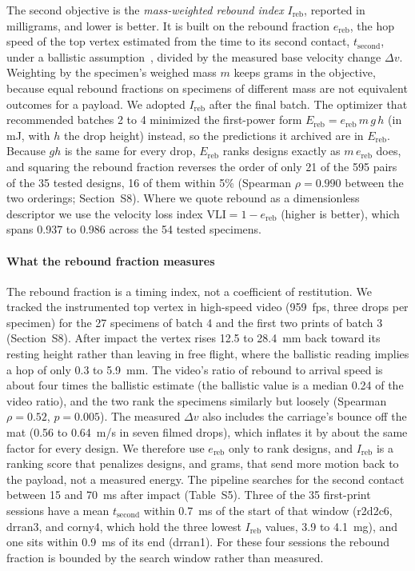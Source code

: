 \documentclass[11pt]{article}
\begin{document}
The second objective is the \emph{mass-weighted rebound index}
$I_{\mathrm{reb}}$, reported in milligrams, and lower is better. It is
built on the rebound fraction $e_{\mathrm{reb}}$, the hop speed of the
top vertex estimated from the time to its second contact,
$t_{\mathrm{second}}$, under a ballistic
assumption~\citep{bernstein1977listening}, divided by the measured base
velocity change $\Delta v$. Weighting by the specimen's weighed mass $m$
keeps grams in the objective, because equal rebound fractions on
specimens of different mass are not equivalent outcomes for a payload.
We adopted $I_{\mathrm{reb}}$ after the final batch. The optimizer that
recommended batches 2 to 4 minimized the first-power form
$E_{\mathrm{reb}} = e_{\mathrm{reb}}\, m\, g\, h$ (in mJ, with $h$ the
drop height) instead, so the predictions it archived are in
$E_{\mathrm{reb}}$. Because $g h$ is the same for every drop,
$E_{\mathrm{reb}}$ ranks designs exactly as $m\,e_{\mathrm{reb}}$ does,
and squaring the rebound fraction reverses the order of only 21 of the
595 pairs of the 35 tested designs, 16 of them within 5\% (Spearman
$\rho = 0.990$ between the two orderings; Section~S8).
Where we quote rebound as a dimensionless descriptor we use the velocity
loss index $\mathrm{VLI} = 1 - e_{\mathrm{reb}}$ (higher is better),
which spans 0.937 to 0.986 across the 54 tested specimens.

\paragraph{What the rebound fraction measures} The rebound fraction is
a timing index, not a coefficient of restitution. We tracked the
instrumented top vertex in high-speed video (\SI{959}{fps}, three drops
per specimen) for the 27 specimens of batch 4 and the first two prints
of batch 3 (Section~S8). After impact the vertex rises
12.5 to \SI{28.4}{mm} back toward its resting height rather than
leaving in free flight, where the ballistic reading implies a hop of
only 0.3 to \SI{5.9}{mm}. The video's ratio of rebound to arrival speed
is about four times the ballistic estimate (the ballistic value is a median 0.24 of the video ratio), and the
two rank the specimens similarly but loosely (Spearman $\rho = 0.52$,
$p = 0.005$). The measured $\Delta v$ also includes the carriage's
bounce off the mat (0.56 to \SI{0.64}{m/s} in seven filmed drops),
which inflates it by about the same factor for every design. We
therefore use $e_{\mathrm{reb}}$ only to rank designs, and
$I_{\mathrm{reb}}$ is a ranking score that penalizes designs, and grams,
that send more motion back to the payload, not a measured
energy. The pipeline searches for the second contact between 15 and
\SI{70}{ms} after impact (Table~S5). Three of the
35 first-print sessions have a mean $t_{\mathrm{second}}$ within
\SI{0.7}{ms} of the start of that window (r2d2c6, drran3, and corny4,
which hold the three lowest $I_{\mathrm{reb}}$ values, 3.9 to
\SI{4.1}{mg}), and one sits within \SI{0.9}{ms} of its end (drran1).
For these four sessions the rebound fraction is bounded by the search
window rather than measured.
\end{document}
